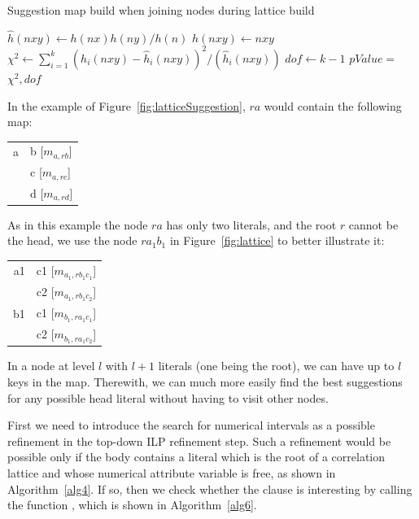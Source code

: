 \begin{algorithm}[h!]
 \caption{Suggestion map build when joining nodes during lattice build}
 \label{alg:buildmaps}
  $\hat{h}(nxy) \leftarrow h(nx)h(ny)/h(n)$\;
  $h(nxy) \leftarrow $$nxy$\FuncSty{)}\;
  $\chi^2 \leftarrow \sum_{i=1}^{k}(h_i(nxy)-\hat{h}_i(nxy))^2/(\hat{h}_i(nxy))$\;
  $dof \leftarrow k-1$\;
  $pValue = $$\chi^2,dof$\FuncSty{)}\;
\end{algorithm}

In the example of Figure~\ref{fig:latticeSuggestion}, $ra$ would contain the following map:

\begin{center}
  \begin{tabular}{r | l}
    a & b [$m_{a,rb}$] \\
      & c [$m_{a,rc}$] \\
      & d [$m_{a,rd}$]
  \end{tabular}
\end{center}

As in this example the node $ra$ has only two literals, and the root $r$ cannot be the head, we use the node $ra_1b_1$
in Figure~\ref{fig:lattice} to better illustrate it:

\begin{center}
  \begin{tabular}{r | l}
    a1 	& c1 [$m_{a_1,rb_1c_1}$] \\
	& c2 [$m_{a_1,rb_1c_2}$] \\
    \hline
    b1	& c1 [$m_{b_1,ra_1c_1}$] \\
	& c2 [$m_{b_1,ra_1c_2}$]
  \end{tabular}
\end{center}

In a node at level $l$ with $l+1$ literals (one being the root), we can have up to $l$ keys in the map. Therewith, we
can much more easily find the best suggestions for any possible head literal without having to visit other nodes.

First we need to introduce the search for numerical intervals as a possible refinement in the top-down ILP refinement
step. Such a refinement would be possible only if the body contains a literal which is the root of a correlation
lattice and whose numerical attribute variable is free, as shown in Algorithm~\ref{alg4}. If so, then we check whether
the clause is interesting by calling the function , which is shown in Algorithm~\ref{alg6}.


